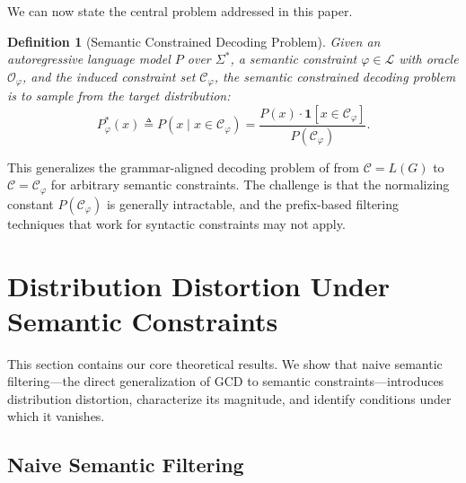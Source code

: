 \documentclass[twoside,11pt]{article}
\newtheorem{definition}[theorem]{Definition}
\newcommand{\Vocab}{\Sigma}
\newcommand{\Oracle}{\mathcal{O}}
\newcommand{\Constraint}{\mathcal{C}}
\newcommand{\Logic}{\mathcal{L}}
\newcommand{\indicator}{\mathbf{1}}
\begin{document}
We can now state the central problem addressed in this paper.

\begin{definition}[Semantic Constrained Decoding Problem]
\label{def:scd}
Given an autoregressive language model $P$ over $\Vocab^*$, a semantic
constraint $\varphi \in \Logic$ with oracle $\Oracle_\varphi$, and the
induced constraint set $\Constraint_\varphi$, the \emph{semantic constrained
decoding problem} is to sample from the target distribution:
\begin{equation}
\label{eq:target-distribution}
P^*_\varphi(x) \triangleq P(x \mid x \in \Constraint_\varphi) =
\frac{P(x) \cdot \indicator[x \in \Constraint_\varphi]}{P(\Constraint_\varphi)}.
\end{equation}
\end{definition}

This generalizes the grammar-aligned decoding problem of
\citet{ugare2024gad} from $\Constraint = L(G)$ to $\Constraint =
\Constraint_\varphi$ for arbitrary semantic constraints. The challenge is
that the normalizing constant $P(\Constraint_\varphi)$ is generally
intractable, and the prefix-based filtering techniques that work for
syntactic constraints may not apply.

\section{Distribution Distortion Under Semantic Constraints}
\label{sec:distortion}

This section contains our core theoretical results. We show that naive
semantic filtering---the direct generalization of GCD to semantic
constraints---introduces distribution distortion, characterize its
magnitude, and identify conditions under which it vanishes.

\subsection{Naive Semantic Filtering}
\label{sec:naive-filtering}
\end{document}
